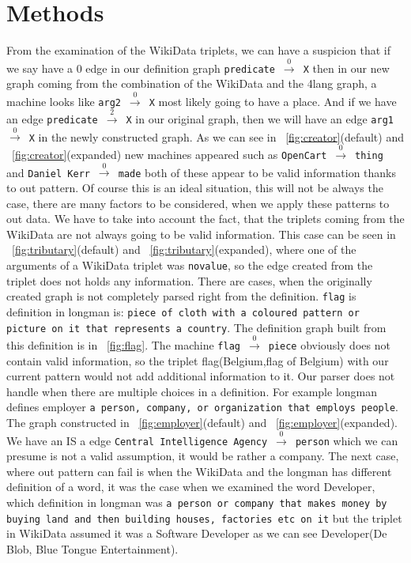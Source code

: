 \documentclass[twoside,b5paper,10pt]{article}
\begin{document}
\section{Methods}
\label{sec:Methods}
From the examination of the WikiData triplets, we can have a suspicion that if we say have a 0 edge in our definition graph \texttt{predicate}~$\xrightarrow0$~\texttt{X} 
then in our new graph coming from the combination of the WikiData and the 4lang graph, a machine looks like \texttt{arg2}~$\xrightarrow0$~\texttt{X} most likely 
going to have a place. And if we have an edge \texttt{predicate}~$\xrightarrow2$~\texttt{X} in our original graph, then we will have an  edge \texttt{arg1}~$\xrightarrow0$~\texttt{X} 
in the newly constructed graph. As we can see in \figurename~\ref{fig:creator}(default) and \figurename~\ref{fig:creator}(expanded) new machines appeared such as \texttt{OpenCart}~$\xrightarrow0$~\texttt{thing} and 
\texttt{Daniel Kerr}~$\xrightarrow0$~\texttt{made} both of these appear to be valid information thanks to out pattern. Of course this is an ideal situation, this will not be always the case, 
there are many factors to be considered, when we apply these patterns to out data. We have to take into account the fact, that the triplets coming from the WikiData are not always going to 
be valid information. This case can be seen in \figurename~\ref{fig:tributary}(default) and \figurename~\ref{fig:tributary}(expanded), where one of the arguments of a WikiData triplet was \texttt{novalue}, 
so the edge created from the triplet does not holds any information. There are cases, when the originally created graph is not completely parsed right from the definition. \texttt{flag} is 
definition in longman is: \texttt {piece of cloth with a coloured pattern or picture on it that represents a country}. The definition graph built from this definition is in \figurename~\ref{fig:flag}. 
The machine \texttt{flag}~$\xrightarrow0$~\texttt{piece} obviously does not contain valid information, so the triplet flag(Belgium,flag of Belgium) with our current pattern would not add additional 
information to it. Our parser does not handle when there are multiple choices in a definition. For example longman defines employer \texttt{a person, company, or organization that employs people}. 
The graph constructed in \figurename~\ref{fig:employer}(default) and \figurename~\ref{fig:employer}(expanded). We have an IS a edge \texttt{Central Intelligence Agency}~$\xrightarrow0$~\texttt{person} which we can presume is not a valid assumption, 
it would be rather a company. The next case, where out pattern can fail is when the WikiData and the longman has different definition of a word, it was the case when we examined the word Developer, which definition in 
longman was \texttt{a person or company that makes money by buying land and then building houses, factories etc on it} but the triplet in WikiData assumed it was a Software Developer as we can see Developer(De Blob, Blue Tongue Entertainment).
\end{document}
